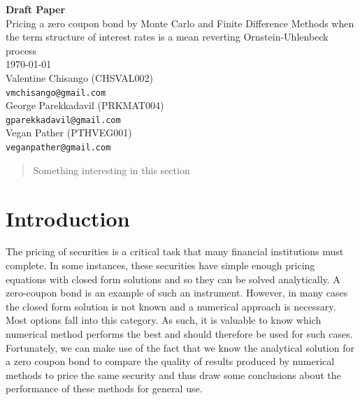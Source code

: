 \documentclass[12pt,a4paper]{article}
\begin{document}
\begin{titlepage}
	
	\begin{center}
		\textbf{{\Large Draft Paper}}\\
		\vspace{1cm}
		{\Large Pricing a zero coupon bond by Monte Carlo and Finite Difference Methods when the term structure of interest rates is a mean reverting Ornstein-Uhlenbeck process}\\
		\vspace{1cm}
		\today\\
		Valentine Chisango (CHSVAL002)\\
		{\tt vmchisango@gmail.com}\\ 
		
		George Parekkadavil (PRKMAT004)\\
		{\tt gparekkadavil@gmail.com}\\
		
		Vegan Pather (PTHVEG001)\\
		\tt {veganpather@gmail.com}
		
	\end{center}

\begin{abstract}
	Something interesting in this section
\end{abstract}	

\end{titlepage}
\newpage

\section{Introduction}
The pricing of securities is a critical task that many financial institutions must complete. In some instances, these securities have simple enough pricing equations with closed form solutions and so they can be solved analytically. A zero-coupon bond is an example of such an instrument. However, in many cases the closed form solution is not known and a numerical approach is necessary. Most options fall into this category. As such, it is valuable to know which numerical method performs the best and should therefore be used for such cases. Fortunately, we can make use of the fact that we know the analytical solution for a zero coupon bond to compare the quality of results produced by numerical methods to price the same security and thus draw some conclusions about the performance of these methods for general use.  
\label{sec: Intro}
\end{document}
